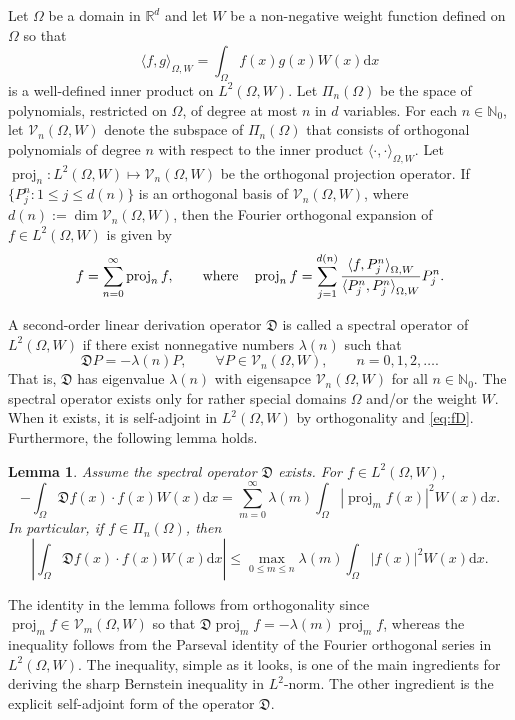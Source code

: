 \documentclass{amsart}
\newtheorem{lem}[thm]{Lemma}
\theoremstyle{remark}
\def\la{{\langle}}
\def\ra{{\rangle}}
\def\d{\mathrm{d}}
\def\fD{{\mathfrak D}}
\def\l{{\lambda}}
\def\la{{\langle}}
\def\ra{{\rangle}}
\def\CV{{\mathcal V}}
\def\NN{{\mathbb N}}
\def\RR{{\mathbb R}}
\def\proj{\operatorname{proj}}
\begin{document}
Let $\Omega$ be a domain in $\RR^d$ and let $W$ be a non-negative weight function defined on $\Omega$ so that
$$
  \la f, g \ra_{\Omega, W} = \int_\Omega f(x) g (x) W(x) \d x
$$
is a well-defined inner product on $L^2(\Omega, W)$. Let $\Pi_n(\Omega)$ be the space of polynomials, restricted
on $\Omega$, of degree at most $n$ in $d$ variables. For each $n \in \NN_0$, let $\CV_n(\Omega, W)$ denote the 
subspace of $\Pi_n(\Omega)$ that consists of orthogonal polynomials of degree $n$ with respect to the inner product
$\la \cdot,\cdot\ra_{\Omega,W}$. Let $\proj_n: L^2(\Omega,W) \mapsto \CV_n(\Omega, W)$ be the orthogonal 
projection operator. If $\{P_j^n: 1 \le j \le d(n) \}$ is an orthogonal basis of $\CV_n(\Omega, W)$, where 
$d(n):= \dim \CV_n(\Omega, W)$, then the Fourier orthogonal expansion of $f \in L^2(\Omega,W)$ is given by 
$$
  f = \sum_{n=0}^\infty \proj_n f, \quad \quad \hbox{where} \quad 
       \proj_n f = \sum_{j=1}^{d(n)} \frac{\la f, P_j^n\ra_{\Omega, W}}{ \la P_j^n, P_j^n\ra_{\Omega, W}} P_j^n.  
$$

A second-order linear derivation operator $\fD$ is called a spectral operator of $L^2(\Omega, W)$ if there exist 
nonnegative numbers $\l(n)$ such that 
\begin{equation} \label{eq:fD}
 \fD P = - \l(n) P, \qquad \forall P \in \CV_n(\Omega, W), \qquad n =0,1,2, \ldots.
\end{equation}
That is, $\fD$ has eigenvalue $\l(n)$ with eigensapce $\CV_n(\Omega, W)$ for all $n\in \NN_0$. 
The spectral operator exists only for rather special domains $\Omega$ and/or the weight $W$. When it exists, 
it is self-adjoint in $L^2(\Omega, W)$ by orthogonality and \eqref{eq:fD}. Furthermore,
the following lemma holds. 

\begin{lem}\label{lem:main}
Assume the spectral operator $\fD$ exists. For $f\in L^2(\Omega, W)$, 
$$
   - \int_\Omega \fD f(x) \cdot f(x) W(x) \d x = \sum_{m= 0}^\infty \lambda(m) \int_\Omega \left|\proj_m f(x)\right|^2 W(x) \d x. 
$$
In particular, if $f \in \Pi_n(\Omega)$, then 
$$
   \left| \int_\Omega \fD f(x) \cdot f(x) W(x) \d x \right| \le \max_{0 \le m \le n} \lambda(m) \int_\Omega |f(x)|^2 W(x) \d x.
$$
\end{lem}

The identity in the lemma follows from orthogonality since $\proj_m f \in \CV_m(\Omega, W)$ so that 
$\fD \proj_m f  = - \lambda(m)\proj_m f$, whereas the inequality follows from the Parseval identity of
the Fourier orthogonal series in $L^2(\Omega, W)$. The inequality, simple as it looks, is one of the main 
ingredients for deriving the sharp Bernstein inequality in $L^2$-norm. The other ingredient is the explicit 
self-adjoint form of the operator $\fD$. 
\end{document}
